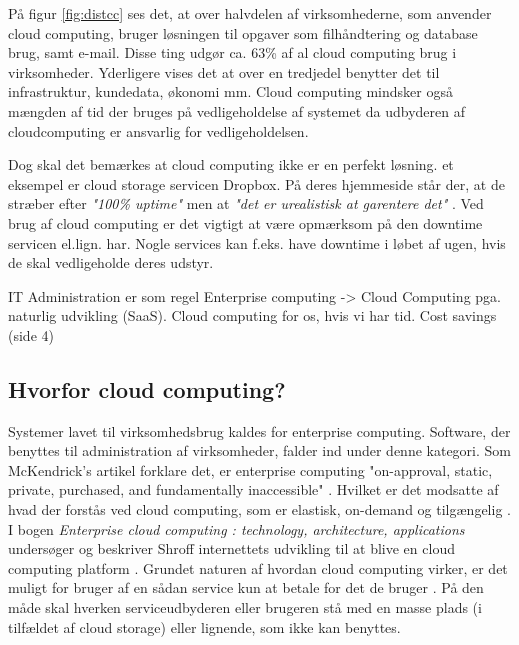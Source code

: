 \newpage
På figur \ref{fig:distcc} ses det, at over halvdelen af virksomhederne, som anvender cloud computing, bruger løsningen til opgaver som filhåndtering og database brug, samt e-mail. Disse ting udgør ca. 63\% af al cloud computing brug i virksomheder. Yderligere vises det at over en tredjedel benytter det til infrastruktur, kundedata, økonomi mm. Cloud computing mindsker også mængden af tid der bruges på vedligeholdelse af systemet da udbyderen af cloudcomputing er ansvarlig for vedligeholdelsen. 

Dog skal det bemærkes at cloud computing ikke er en perfekt løsning. et eksempel er cloud storage servicen Dropbox. På deres hjemmeside står der, at de stræber efter \textit{"100\% uptime"} men at \textit{"det er urealistisk at garentere det"} \citep{drpbx_downtime}. Ved brug af cloud computing er det vigtigt at være opmærksom på den downtime servicen el.lign. har. Nogle services kan f.eks. have downtime i løbet af ugen, hvis de skal vedligeholde deres udstyr.

IT Administration er som regel Enterprise computing ->
Cloud Computing pga. naturlig udvikling (SaaS). 
Cloud computing for os, hvis vi har tid.
Cost savings (side 4)\\
\subsection{Hvorfor cloud computing?}
Systemer lavet til virksomhedsbrug kaldes for enterprise computing. Software, der benyttes til administration af virksomheder, falder ind under denne kategori. Som McKendrick's artikel forklare det, er enterprise  computing "on-approval, static, private, purchased, and fundamentally inaccessible" \citep{McKendrick2014}. Hvilket er det modsatte af hvad der forstås ved cloud computing, som er elastisk, on-demand og tilgængelig \citep{McKendrick2014}. I bogen \textit{Enterprise cloud computing : technology, architecture, applications} undersøger og beskriver Shroff internettets udvikling til at blive en cloud computing platform \citep{Shroff2010}. Grundet naturen af hvordan cloud computing virker, er det muligt for bruger af en sådan service kun at betale for det de bruger \citep{Shroff2010}. På den måde skal hverken serviceudbyderen eller brugeren stå med en masse plads (i tilfældet af cloud storage) eller lignende, som ikke kan benyttes. %




